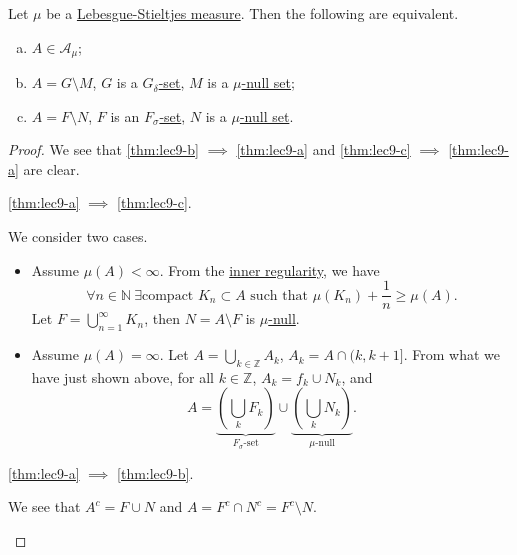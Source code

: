 \begin{theorem}\label{thm:lec9}
	Let \(\mu \) be a \hyperref[def:Lebesgue-Stieltjes-measure]{Lebesgue-Stieltjes measure}. Then the following are equivalent.
	\begin{enumerate}[(a)]
		\item\label{thm:lec9-a} \(A\in \mathcal{A} _\mu \);
		\item\label{thm:lec9-b} \(A = G\setminus M\), \(G\) is a \hyperref[def:G-delta-set]{\(G_{\delta}\)-set}, \(M\) is a \hyperref[def:mu-null-set]{\(\mu\)-null set};
		\item\label{thm:lec9-c} \(A = F\setminus N\), \(F\) is an \hyperref[def:F-sigma-set]{\(F_{\sigma}\)-set}, \(N\) is a \hyperref[def:mu-null-set]{\(\mu\)-null set}.
	\end{enumerate}
\end{theorem}
\begin{proof}
	We see that \autoref{thm:lec9-b} \(\implies \) \autoref{thm:lec9-a} and \autoref{thm:lec9-c} \(\implies \) \autoref{thm:lec9-a} are clear.
	\begin{claim}
		\autoref{thm:lec9-a} \(\implies \) \autoref{thm:lec9-c}.
	\end{claim}
	\begin{explanation}
		We consider two cases.
		\begin{itemize}
			\item Assume \(\mu (A)<\infty \). From the \hyperref[thm:inner-regularity]{inner regularity}, we have
			      \[
				      \forall n\in\mathbb{N} \ \exists \text{compact }K_{n}\subset A\text{ such that } \mu (K_{n}) + \frac{1}{n} \geq \mu (A).
			      \]
			      Let \(F = \bigcup_{n=1}^{\infty} K_{n}\), then \(N = A\setminus F\) is \hyperref[def:mu-null-set]{\(\mu\)-null}.
			\item Assume \(\mu (A) = \infty \). Let \(A = \bigcup_{k\in\mathbb{Z} } A_{k}\), \(A_{k} = A\cap (k, k+1]\). From what we have just shown above, for all \(k \in \mathbb{Z} \), \(A_k = f_k \cup N_k\), and
			      \[
				      A = \underbrace{\left(\bigcup_{k}F_{k} \right)}_{\hyperref[def:F-sigma-set]{F_{\sigma}\text{-set}}}\cup \underbrace{\left(\bigcup_{k}N_{k}\right)}_{\hyperref[def:mu-null-set]{\mu\text{-null}}}.
			      \]
		\end{itemize}
	\end{explanation}

	\begin{claim}
		\autoref{thm:lec9-a} \(\implies \) \autoref{thm:lec9-b}.
	\end{claim}
	\begin{explanation}
		We see that \(A^{c} = F\cup N\) and \(A = F^{c} \cap N^{c} = F^{c} \setminus N\).
	\end{explanation}
\end{proof}


